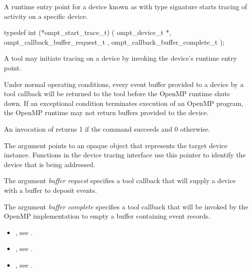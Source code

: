 \label{sec:ompt_start_trace_t}

\summary
A runtime entry point for a device known as 
with type signature 
starts tracing of activity on a specific device.

\format
\begin{ccppspecific}
\begin{omptInquiry}
typedef int (*ompt_start_trace_t) (
  ompt_device_t *,
  ompt_callback_buffer_request_t ,
  ompt_callback_buffer_complete_t 
);
\end{omptInquiry}
\end{ccppspecific}

\descr
A tool may initiate tracing on a device by invoking the device's 
runtime entry point.

Under normal operating conditions, every event buffer provided to
a device by a tool callback will be returned to the tool
before the OpenMP runtime shuts down.
If an exceptional condition terminates  execution of an OpenMP
program, the OpenMP runtime may not return buffers provided to the
device.

An invocation of  returns 1 if the command
succeeds and 0 otherwise.

\argdesc
The  argument points to an opaque object that represents
the target device instance. Functions in the device tracing interface
use this pointer to identify the device that is being addressed.

The argument \emph{buffer request} specifies a tool callback
that will supply a device with a buffer to deposit events.

The argument \emph{buffer complete} specifies a tool callback
that will be invoked by the OpenMP implementation to empty a buffer
containing event records.

\crossreferences
\begin{itemize}
\item {},
see .
\item {},
see .
\item {},
see .
\end{itemize}

\label{sec:ompt_pause_trace_t}

